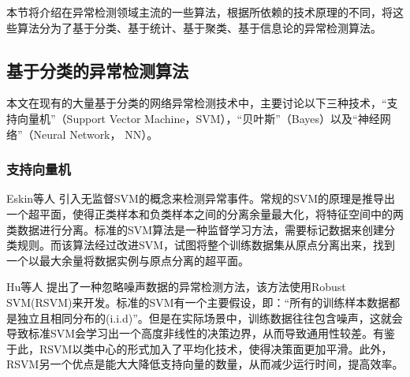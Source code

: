 本节将介绍在异常检测领域主流的一些算法，根据所依赖的技术原理的不同，将这些算法分为了基于分类、基于统计、基于聚类、基于信息论的异常检测算法。

\subsection{基于分类的异常检测算法}



本文在现有的大量基于分类的网络异常检测技术中，主要讨论以下三种技术，“支持向量机”（Support Vector Machine，SVM），“贝叶斯”（Bayes）以及“神经网络”（Neural Network， NN）。

\subsubsection{支持向量机}
Eskin等人\cite{2002AEskin} 引入无监督SVM的概念来检测异常事件。常规的SVM的原理是推导出一个超平面，使得正类样本和负类样本之间的分离余量最大化，将特征空间中的两类数据进行分离。标准的SVM算法是一种监督学习方法，需要标记数据来创建分类规则。而该算法经过改进SVM，试图将整个训练数据集从原点分离出来，找到一个以最大余量将数据实例与原点分离的超平面。

Hu等人\cite{Hu2003Robust} 提出了一种忽略噪声数据的异常检测方法，该方法使用Robust SVM(RSVM)来开发。标准的SVM有一个主要假设，即：“所有的训练样本数据都是独立且相同分布的(i.i.d)”。但是在实际场景中，训练数据往往包含噪声，这就会导致标准SVM会学习出一个高度非线性的决策边界，从而导致通用性较差。有鉴于此，RSVM以类中心的形式加入了平均化技术，使得决策面更加平滑。此外，RSVM另一个优点是能大大降低支持向量的数量，从而减少运行时间，提高效率。

